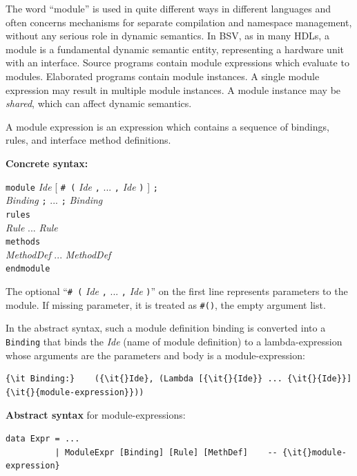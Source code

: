 \documentclass[11pt]{article}
\newcommand{\hm}{\hspace*{1em}}
\newcommand{\hmm}{\hspace*{2em}}
\newcommand{\nterm}[1]{\emph{#1}}
\newcommand{\term}[1]{\texttt{#1}}
\newcommand{\many}[2]{#1 #2 ... #2 #1}
\newcommand{\opt}[1]{[ #1 ]}
\newcommand{\gram}[2]{    \hm\makebox[10em][l]{\it #1}\makebox[1.5em][l]{::=}    #2}
\newcommand{\grammore}[1]{\hm\makebox[10em][l]{      }\makebox[1.5em][l]{}       #1}
\begin{document}
\label{sec_syntax_module_definitions}

The word ``module'' is used in quite different ways in different
languages and often concerns mechanisms for separate compilation and
namespace management, without any serious role in dynamic semantics.
In BSV, as in many HDLs, a module is a fundamental dynamic semantic
entity, representing a hardware unit with an interface.  Source
programs contain module expressions which evaluate to modules.
Elaborated programs contain module instances.  A single module
expression may result in multiple module instances.  A module instance
may be \emph{shared}, which can affect dynamic semantics.

A module expression is an expression which contains a sequence of
bindings, rules, and interface method definitions.

{\bf Concrete syntax:}

\gram{ModuleDefinition}{\term{module} \nterm{Ide} \opt{\term{\# (} \many{\nterm{Ide}}{\term{,}} \term{)}} \term{;}} \\
\grammore{\hmm \many{\nterm{Binding}}{\term{;}}} \\
\grammore{\hm \term{rules}} \\
\grammore{\hmm \many{\nterm{Rule}}{\hm}} \\
\grammore{\hm \term{methods}} \\
\grammore{\hmm \many{\nterm{MethodDef}}{\hm}} \\
\grammore{\term{endmodule}}

The optional ``\term{\# (} \many{\nterm{Ide}}{\term{,}} \term{)}'' on
the first line represents parameters to the module.  If missing
parameter, it is treated as \term{\#()}, the empty argument list.

In the abstract syntax, such a module definition binding is converted
into a \term{Binding} that binds the \nterm{Ide} (name of module
definition) to a lambda-expression whose arguments are the parameters
and body is a module-expression:

\begin{Verbatim}[frame=single, commandchars=\\\{\}]
{\it Binding:}    ({\it{}Ide}, (Lambda [{\it{}{Ide}} ... {\it{}{Ide}}] {\it{}{module-expression}}))
\end{Verbatim}

{\bf Abstract syntax} for module-expressions:

\begin{Verbatim}[frame=single, commandchars=\\\{\}]
data Expr = ...
          | ModuleExpr [Binding] [Rule] [MethDef]    -- {\it{}module-expression}
\end{Verbatim}
\end{document}
